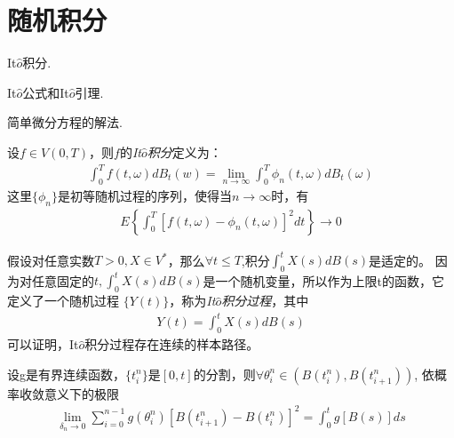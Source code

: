 
\chapter{随机积分}

\begin{compactitem}
	\item It\(\hat{o}\)积分.
	\item It\(\hat{o}\)公式和It\(\hat{o}\)引理.
	\item 简单微分方程的解法.
\end{compactitem}

\begin{definition}\label{def:ItoInt}
	设\(f\in V(0,T)\)，则\(f\)的\emph{It\(\hat{o}\)积分}定义为：
	\begin{align*}
		\int_0^T f(t,\omega)dB_t(w)=\underset{n\to \infty}{\lim}
		\int_0^T \phi_n(t,\omega)dB_t(\omega)
	\end{align*}
	这里\(\{\phi _n\}\)是初等随机过程的序列，使得当\(n\to \infty\)时，有
	\begin{align*}
		E\left\{ \int_0^T[f(t,\omega)-\phi_n(t,\omega)]^2dt\right\}\to 0
	\end{align*}
\end{definition}

\begin{definition}\label{def:ItoIntpro}
	假设对任意实数\(T>0,X\in V^*\)，那么\(\forall t\leqslant T\),积分\(\int_0^t X(s)dB(s)\)是适定的。
	因为对任意固定的\(t,\int_0^t X(s)dB(s)\)是一个随机变量，所以作为上限t的函数，它定义了一个随机过程
	\(\{Y(t)\}\)，称为\emph{It\(\hat{o}\)积分过程}，其中
	\begin{align*}
		Y(t)=\int_0^t X(s)dB(s)
	\end{align*}
	可以证明，It\(\hat{o}\)积分过程存在连续的样本路径。
\end{definition}

\begin{theorem}[It\(\hat{o}\)公式]\label{prop:ItoFormula}
	设g是有界连续函数，\(\{t_i^n\}\)是\([0,t]\)的分割，则\(\forall\theta_i^n \in (B(t_i^n),B(t^n_{i+1}))\),
	依概率收敛意义下的极限
	\begin{align*}
		\underset{\delta_n \to 0}{\lim}\sum_{i=0}^{n-1}g(\theta_i^n)[B(t_{i+1}^n)-B(t_i^n)]^2=\int_0^tg[B(s)]ds
	\end{align*}
\end{theorem}

